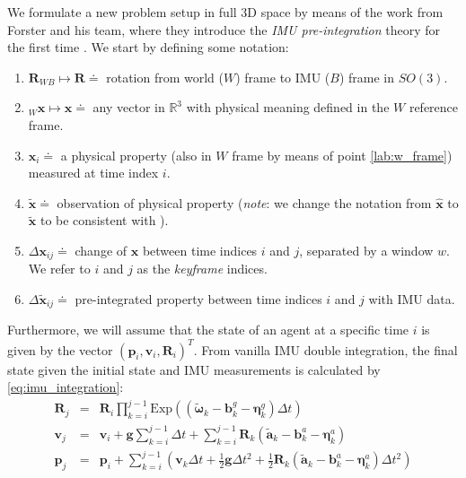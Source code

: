 We formulate a new problem setup in full 3D space by means of the work from Forster and his team, where they introduce the \emph{IMU pre-integration} theory for the first time \cite{DBLP:journals/corr/ForsterCDS15}.
We start by defining some notation:
\begin{enumerate}
    \item $\mathbf{R}_{WB}\mapsto \mathbf{R}\doteq$ rotation from world ($W$) frame to IMU ($B$) frame in $SO(3)$.
    \item\label{lab:w_frame} $_W\mathbf{x}\mapsto\mathbf{x} \doteq$ any vector in $\mathbb{R}^3$ with physical meaning defined in the $W$ reference frame.
    \item $\mathbf{x}_i\doteq$ a physical property (also in $W$ frame by means of point \ref{lab:w_frame}) measured at time index $i$.
    \item $\mathbf{\tilde{x}}\doteq$ observation of physical property (\emph{note}: we change the notation from $\mathbf{\hat{x}}$ to $\mathbf{\tilde{x}}$ to be consistent with \cite{DBLP:journals/corr/ForsterCDS15}).
    \item $\Delta\mathbf{x}_{ij}\doteq$ change of $\mathbf{x}$ between time indices $i$ and $j$, separated by a window $w$. We refer to $i$ and $j$ as the \emph{keyframe} indices.
    \item $\Delta\mathbf{\tilde{x}}_{ij}\doteq$ pre-integrated property between time indices $i$ and $j$ with IMU data.
\end{enumerate}
Furthermore, we will assume that the state of an agent at a specific time $i$ is given by the vector $(\mathbf{p}_i, \mathbf{v}_i, \mathbf{R}_i)^T$.
From vanilla IMU double integration, the final state given the initial state and IMU measurements is calculated by \ref{eq:imu_integration}:
\begin{eqnarray}\label{eq:imu_integration}
    \mathbf{R}_j & = & \mathbf{R}_i\prod_{k=i}^{j-1}\textrm{Exp}\left(\left(\tilde{\boldsymbol{\omega}}_k -\mathbf{b}^g_k - \boldsymbol\eta^g_k\right )\Delta t \right ) \nonumber\\
    \mathbf{v}_j & = & \mathbf{v}_i + \mathbf{g}\sum_{k=i}^{j-1}\Delta t + \sum_{k=i}^{j-1}\mathbf{R}_k\left(\tilde{\boldsymbol{a}}_k -\mathbf{b}^a_k - \boldsymbol\eta^a_k \right )\\
    \mathbf{p}_j & = & \mathbf{p}_i + \sum_{k=i}^{j-1}\left(\mathbf{v}_k\Delta t + \tfrac{1}{2}\mathbf{g}\Delta t^2 + \tfrac{1}{2}\mathbf{R}_k\left(\tilde{\boldsymbol{a}}_k -\mathbf{b}^a_k - \boldsymbol\eta^a_k \right)\Delta t^2\right)\nonumber
\end{eqnarray}
